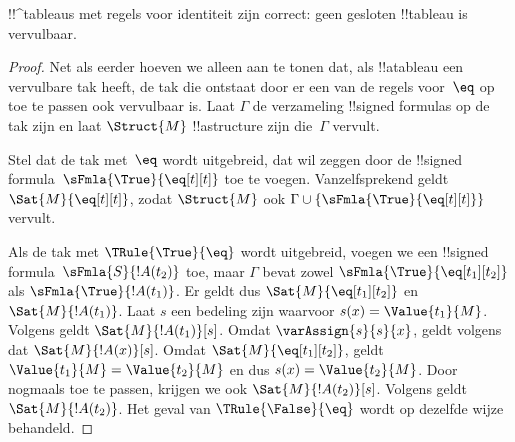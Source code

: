 \documentclass[openany]{memoir}
\begin{document}
\begingroup
\def\olfilename{OLP-0111}
\def\olfilepath{content/first-order-logic/tableaux/}
\hypertarget{unit-OLP-0111}{}





\begin{prop}
!!^{tableau}s met regels voor identiteit zijn correct: geen gesloten
!!{tableau} is vervulbaar.
\end{prop}

\begin{proof}
Net als eerder hoeven we alleen aan te tonen dat, als !!a{tableau} een
vervulbare tak heeft, de tak die ontstaat door er een van de regels
voor~$\eq$ op toe te passen ook vervulbaar is. Laat $\Gamma$ de
verzameling !!{signed formula}s op de tak zijn en laat $\Struct{M}$
!!a{structure} zijn die~$\Gamma$ vervult.

Stel dat de tak met~$\eq$ wordt uitgebreid, dat wil zeggen door de
!!{signed formula}~$\sFmla{\True}{\eq[t][t]}$ toe te voegen.
Vanzelfsprekend geldt $\Sat{M}{\eq[t][t]}$, zodat $\Struct{M}$ ook
$\Gamma \cup \{\sFmla{\True}{\eq[t][t]}\}$ vervult.

Als de tak met $\TRule{\True}{\eq}$ wordt uitgebreid, voegen we een
!!{signed formula}~$\sFmla{S}{!A(t_2)}$ toe, maar $\Gamma$ bevat zowel
$\sFmla{\True}{\eq[t_1][t_2]}$ als $\sFmla{\True}{!A(t_1)}$. Er geldt
dus $\Sat{M}{\eq[t_1][t_2]}$ en $\Sat{M}{!A(t_1)}$. Laat $s$ een
bedeling zijn waarvoor $s(x) = \Value{t_1}{M}$. Volgens
 geldt
$\Sat{M}{!A(t_1)}[s]$. Omdat $\varAssign{s}{s}{x}$, geldt volgens
 dat $\Sat{M}{!A(x)}[s]$. Omdat
$\Sat{M}{\eq[t_1][t_2]}$, geldt
$\Value{t_1}{M} = \Value{t_2}{M}$ en dus $s(x) = \Value{t_2}{M}$.
Door  nogmaals toe te passen,
krijgen we ook $\Sat{M}{!A(t_2)}[s]$. Volgens
 geldt
$\Sat{M}{!A(t_2)}$. Het geval van $\TRule{\False}{\eq}$ wordt op
dezelfde wijze behandeld.
\end{proof}
\endgroup
\OLEndChapterHook
\end{document}
